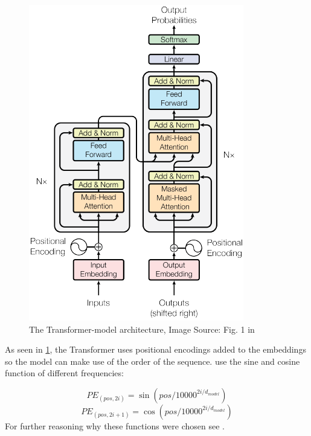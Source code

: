 \documentclass[]{krantz}
\begin{document}
\begin{figure}

{\centering \includegraphics[width=\textwidth,height=0.5\textheight]{figures/02-02-attention-and-self-attention-for-nlp/transformer-full-model} 

}

\caption{The Transformer-model architecture, Image Source: Fig. 1 in \citep{vaswani2017attention}}\label{fig:transformer-full}
\end{figure}

As seen in \ref{fig:transformer-full}, the Transformer uses positional encodings
added to the embeddings so the model can make use of the order of the sequence.
\citet{vaswani2017attention} use the sine and cosine function of different frequencies:

\[
PE_{(pos,2i)} = \sin(pos/10000^{2i/d_{model}})
\]
\[
PE_{(pos,2i+1)} = \cos(pos/10000^{2i/d_{model}})
\]
For further reasoning why these functions were chosen see \citet{vaswani2017attention}.
\end{document}
